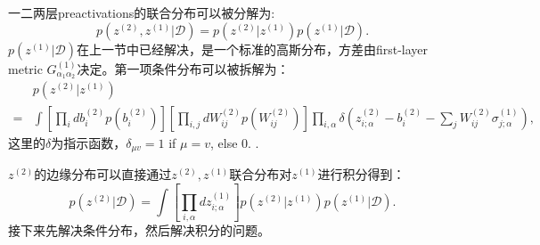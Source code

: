 一二两层preactivations的联合分布可以被分解为:
\begin{equation}
    p\left(z^{(2)},z^{(1)} \bigg| \mathcal{D} \right) = p\left(z^{(2)} \bigg| z^{(1)}\right)
        p\left(z^{(1)} \bigg| \mathcal{D} \right).
\end{equation}
$p\left(z^{(1)} \bigg| \mathcal{D} \right)$在上一节中已经解决，是一个标准的高斯分布，方差由first-layer
metric $G_{\alpha_1\alpha_2}^{(1)}$决定。第一项条件分布可以被拆解为：
\begin{equation}
    \begin{aligned}
    & p\left(z^{(2)} \bigg| z^{(1)}\right) \\
    =& \int \left[\prod_i db_i^{(2)}p(b_i^{(2)})\right]\left[\prod_{i,j}dW_{ij}^{(2)}
        p\left(W_{ij}^{(2)}\right)\right]\prod_{i,\alpha}\delta\left(z_{i;\alpha}^{(2)}
        -b_i^{(2)} - \sum_j W_{ij}^{(2)}\sigma_{j;\alpha}^{(1)}\right),
    \end{aligned}
\end{equation}
这里的$\delta$为指示函数，$\delta_{\mu v} = 1$ if $\mu = v$, else $0$. .

$z^{(2)}$的边缘分布可以直接通过$z^{(2)},z^{(1)}$联合分布对$z^{(1)}$进行积分得到：
\begin{equation}
    p\left(z^{(2)} \bigg| \mathcal{D} \right) = \int \left[\prod_{i,\alpha}
        dz_{i;\alpha}^{(1)}\right]p\left(z^{(2)}\big| z^{(1)}\right)
        p\left(z^{(1)}\big| \mathcal{D}\right).
\end{equation}
接下来先解决条件分布，然后解决积分的问题。

